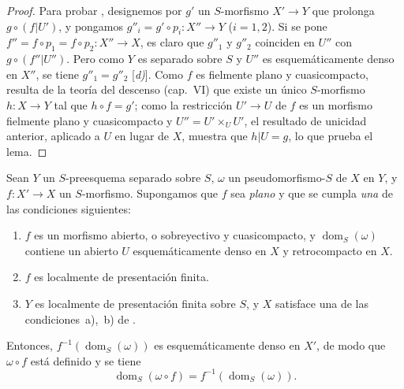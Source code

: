 \begin{proof}
Para probar , designemos por $g'$ un $S$-morfismo $X'\to Y$ que prolonga $g\circ(f|U')$, y pongamos $g''_i=g'\circ p_i:X''\to Y$ ($i=1,2$).
Si se pone $f''=f\circ p_1=f\circ p_2:X''\to X$, es claro que $g''_1$ y $g''_2$ coinciden en $U''$ con $g\circ(f''|U'')$.
Pero como $Y$ es separado sobre $S$ y $U''$ es esquemáticamente denso en $X''$, se tiene $g''_1=g''_2$ [\emph{d)}].
Como $f$ es fielmente plano y cuasicompacto, resulta de la teoría del descenso (cap.~VI) que existe un único $S$-morfismo $h:X\to Y$ tal que $h\circ f=g'$; como la restricción $U'\to U$ de $f$ es un morfismo fielmente plano y cuasicompacto y $U''=U'\times_U U'$, el resultado de unicidad anterior, aplicado a $U$ en lugar de $X$, muestra que $h|U=g$, lo que prueba el lema.
\end{proof}

\begin{proposition}[20.3.11]
\label{IV.20.3.11}
Sean $Y$ un $S$-preesquema separado sobre $S$, $\omega$ un pseudomorfismo-$S$ de $X$ en $Y$, y $f:X'\to X$ un $S$-morfismo.
Supongamos que $f$ sea \emph{plano} y que se cumpla \emph{una} de las condiciones siguientes:
\begin{enumerate}[label=\emph{(\roman*)}]
  \item $f$ es un morfismo abierto, o sobreyectivo y cuasicompacto, y $\operatorname{dom}_S(\omega)$ contiene un abierto $U$ esquemáticamente denso en $X$ y retrocompacto en $X$.
  \item $f$ es localmente de presentación finita.
  \item $Y$ es localmente de presentación finita sobre $S$, y $X$ satisface una de las condiciones~\textup{a)},~\textup{b)} de .
\end{enumerate}
Entonces, $f^{-1}(\operatorname{dom}_S(\omega))$ es esquemáticamente denso en $X'$, de modo que $\omega\circ f$ está definido  y se tiene
\[
\label{IV.20.3.11.1}
  \operatorname{dom}_S(\omega\circ f)=f^{-1}(\operatorname{dom}_S(\omega)).
  \tag{20.3.11.1}
\]
\end{proposition}

